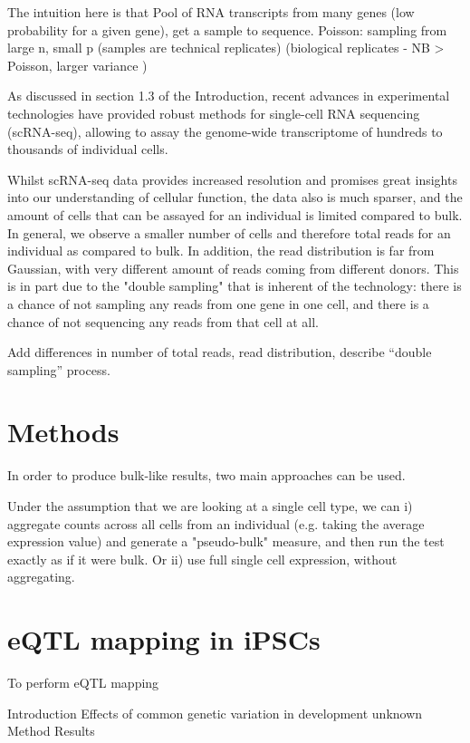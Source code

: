 The intuition here is that 
Pool of RNA transcripts from many genes (low probability for a given gene), get a sample to sequence. Poisson: sampling from large n, small p (samples are technical replicates)
(biological replicates - NB > Poisson, larger variance )

As discussed in section 1.3 of the Introduction, recent advances in experimental technologies have provided robust methods for single-cell RNA sequencing (scRNA-seq), allowing to assay the genome-wide transcriptome of hundreds to thousands of individual cells. 

Whilst scRNA-seq data provides increased resolution and promises great insights into our understanding of cellular function, the data also is much sparser, and the amount of cells that can be assayed for an individual is limited compared to bulk.
In general, we observe a smaller number of cells and therefore total reads for an individual as compared to bulk. 
In addition, the read distribution is far from Gaussian, with very different amount of reads coming from different donors. 
This is in part due to the "double sampling" that is inherent of the technology: there is a chance of not sampling any reads from one gene in one cell, and there is a chance of not sequencing any reads from that cell at all.

Add differences in number of total reads, read distribution, describe “double sampling” process.

\section{Methods}

In order to produce bulk-like results, two main approaches can be used.

Under the assumption that we are looking at a single cell type, we can i) aggregate counts across all cells from an individual (e.g. taking the average expression value) and generate a "pseudo-bulk" measure, and then run the test exactly as if it were bulk. Or ii) use full single cell expression, without aggregating.

\section{eQTL mapping in iPSCs}

To perform eQTL mapping 

Introduction
Effects of common genetic variation in development unknown
Method
Results

